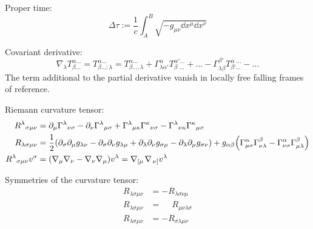 			\noindent
			Proper time:
			\begin{equation}
				\Delta\tau := \frac{1}{c}\int_A^B\sqrt{-g_{\mu\nu}\dd x^\mu \dd x^\nu}
			\end{equation}

			\noindent
			Covariant derivative:
			\begin{equation}
				\nabla_\lambda T^{\alpha ...}_{\beta...} =
				T^{\alpha ...}_{\beta...;\lambda} = T^{\alpha...}_{\beta ...,\lambda}
				+ \Gamma^\alpha_{\lambda\alpha'} T^{\alpha'...}_{\beta\phantom{\prime}...} + ...
				-\Gamma^{\beta'}_{\lambda\beta} T^{\alpha\phantom{\prime}...}_{\beta'...} - ...
			\end{equation}
			The term additional to the partial derivative vanish in locally free falling frames of reference.

			\noindent
			Riemann curvature tensor:
			\begin{equation}
				\begin{aligned}
					R^{\lambda}{}_{\sigma\mu\nu} &=
					\partial_{\mu}\Gamma^{\lambda}{}_{\nu\sigma} -
					\partial_{\nu}\Gamma^{\lambda}{}_{\mu\sigma} +
					\Gamma^{\lambda}{}_{\mu\kappa}\Gamma^{\kappa}{}_{\nu\sigma} -
					\Gamma^{\lambda}{}_{\nu\kappa}\Gamma^{\kappa}{}_{\mu\sigma} \\
					R_{\lambda\sigma\mu\nu} &= \frac{1}{2}\qty(
					\partial_\sigma \partial_\mu g_{\lambda\nu} - \partial_\sigma \partial_\nu g_{\lambda\mu} + \partial_\lambda \partial_\nu g_{\sigma\mu} - \partial_\lambda \partial_\mu g_{\sigma\nu})
					+ g_{\alpha\beta} \qty(
					\Gamma^{\alpha}_{\mu\sigma} \Gamma^{\beta}_{\nu\lambda} - \Gamma^{\alpha}_{\nu\sigma} \Gamma^{\beta}_{\mu\lambda})
					\\
					R^{\lambda}{}_{\sigma\mu\nu}v^\sigma &= \qty(\nabla_\mu \nabla_\nu - \nabla_\nu \nabla_\mu) v^\lambda = \nabla_{\left[\mu\right.}\nabla_{\left.\nu\right]} v^\lambda
				\end{aligned}
			\end{equation}

			\noindent
			Symmetries of the curvature tensor:
			\begin{equation}
				\begin{aligned}
					R_{\lambda\sigma\mu\nu} &= - R_{\lambda\sigma\nu\mu} \\
					R_{\lambda\sigma\mu\nu} &= \phantom{-} R_{\mu\nu\lambda\sigma} \\
					R_{\lambda\sigma\mu\nu} &= - R_{\sigma\lambda\mu\nu} \\
				\end{aligned}
			\end{equation}

